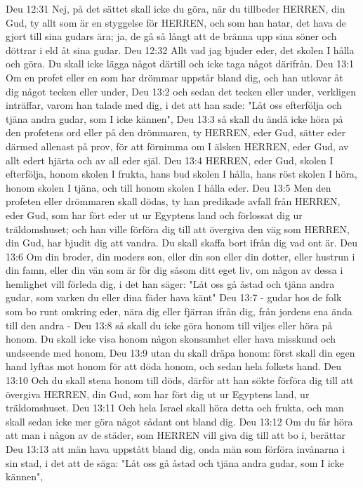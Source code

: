 Deu 12:31  Nej, på det sättet skall icke du göra, när du tillbeder HERREN, din Gud, ty allt som är en styggelse för HERREN, och som han hatar, det hava de gjort till sina gudars ära; ja, de gå så långt att de bränna upp sina söner och döttrar i eld åt sina gudar.
Deu 12:32  Allt vad jag bjuder eder, det skolen I hålla och göra. Du skall icke lägga något därtill och icke taga något därifrån.
Deu 13:1  Om en profet eller en som har drömmar uppstår bland dig, och han utlovar åt dig något tecken eller under,
Deu 13:2  och sedan det tecken eller under, verkligen inträffar, varom han talade med dig, i det att han sade: "Låt oss efterfölja och tjäna andra gudar, som I icke kännen",
Deu 13:3  så skall du ändå icke höra på den profetens ord eller på den drömmaren, ty HERREN, eder Gud, sätter eder därmed allenast på prov, för att förnimma om I älsken HERREN, eder Gud, av allt edert hjärta och av all eder själ.
Deu 13:4  HERREN, eder Gud, skolen I efterfölja, honom skolen I frukta, hans bud skolen I hålla, hans röst skolen I höra, honom skolen I tjäna, och till honom skolen I hålla eder.
Deu 13:5  Men den profeten eller drömmaren skall dödas, ty han predikade avfall från HERREN, eder Gud, som har fört eder ut ur Egyptens land och förlossat dig ur träldomshuset; och han ville förföra dig till att övergiva den väg som HERREN, din Gud, har bjudit dig att vandra. Du skall skaffa bort ifrån dig vad ont är.
Deu 13:6  Om din broder, din moders son, eller din son eller din dotter, eller hustrun i din famn, eller din vän som är för dig såsom ditt eget liv, om någon av dessa i hemlighet vill förleda dig, i det han säger: "Låt oss gå åstad och tjäna andra gudar, som varken du eller dina fäder hava känt"
Deu 13:7  - gudar hos de folk som bo runt omkring eder, nära dig eller fjärran ifrån dig, från jordens ena ända till den andra -
Deu 13:8  så skall du icke göra honom till viljes eller höra på honom. Du skall icke visa honom någon skonsamhet eller hava misskund och undseende med honom,
Deu 13:9  utan du skall dräpa honom: först skall din egen hand lyftas mot honom för att döda honom, och sedan hela folkets hand.
Deu 13:10  Och du skall stena honom till döds, därför att han sökte förföra dig till att övergiva HERREN, din Gud, som har fört dig ut ur Egyptens land, ur träldomshuset.
Deu 13:11  Och hela Israel skall höra detta och frukta, och man skall sedan icke mer göra något sådant ont bland dig.
Deu 13:12  Om du får höra att man i någon av de städer, som HERREN vill giva dig till att bo i, berättar
Deu 13:13  att män hava uppstått bland dig, onda män som förföra invånarna i sin stad, i det att de säga: "Låt oss gå åstad och tjäna andra gudar, som I icke kännen",
